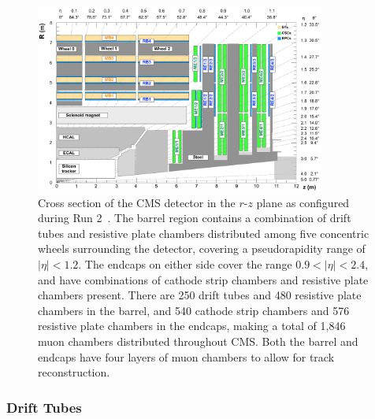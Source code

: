 \begin{figure}[htbp]
  \centering
  \includegraphics[width=0.85\textwidth]{fig/experiment/cms_crosssec.pdf}
  \caption[
    Cross section of the CMS detector in the $r$-$z$ plane as configured during Run 2.
    The barrel region contains a combination of drift tubes and resistive plate chambers distributed among five concentric wheels surrounding the detector, covering a pseudorapidity range of $|\eta|<1.2$.
    The endcaps on either side cover the range $0.9<|\eta|<2.4$, and have combinations of cathode strip chambers and resistive plate chambers present.
    There are 250 drift tubes and 480 resistive plate chambers in the barrel, and 540 cathode strip chambers and 576 resistive plate chambers in the endcaps, making a total of 1,846 muon chambers distributed throughout CMS.
    Both the barrel and endcaps have four layers of muon chambers to allow for track reconstruction.
  ]{
    Cross section of the CMS detector in the $r$-$z$ plane as configured during Run 2~\cite{Sirunyan_2018_CMS}.
    The barrel region contains a combination of drift tubes and resistive plate chambers distributed among five concentric wheels surrounding the detector, covering a pseudorapidity range of $|\eta|<1.2$.
    The endcaps on either side cover the range $0.9<|\eta|<2.4$, and have combinations of cathode strip chambers and resistive plate chambers present.
    There are 250 drift tubes and 480 resistive plate chambers in the barrel, and 540 cathode strip chambers and 576 resistive plate chambers in the endcaps, making a total of 1,846 muon chambers distributed throughout CMS.
    Both the barrel and endcaps have four layers of muon chambers to allow for track reconstruction.
  }
  \label{fig:CMScrosssec}
\end{figure}

\subsubsection{Drift Tubes}

